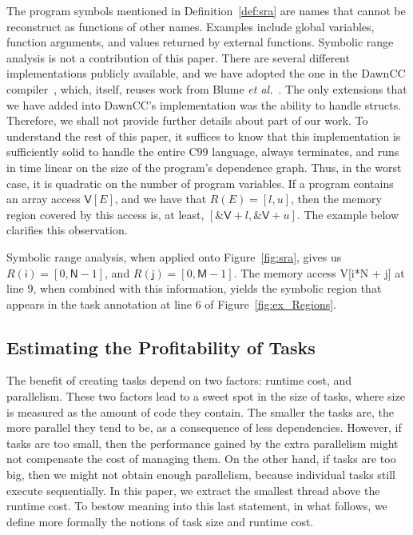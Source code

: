 \documentclass[sigplan,10pt,review,anonymous]{acmart}
\newcommand\dawn{\mbox{\textsf{DawnCC}}}
\begin{document}
The program symbols mentioned in Definition~\ref{def:sra} are names that cannot be
reconstruct as functions of other names.
Examples include global variables, function arguments, and values returned by
external functions.
Symbolic range analysis is not a contribution of this paper.
There are several different implementations publicly available, and we have
adopted the one in the \dawn{} compiler~\cite{Mendonca17}, which, itself,
reuses work from Blume {\em et al.}~\cite{Blume94}.
The only extensions that we have added into \dawn's implementation was
the ability to handle \textsf{structs}.
Therefore, we shall not provide further details about part of our work.
To understand the rest of this paper, it suffices to know that this implementation
is sufficiently solid to handle the entire C99 language, always terminates, and
runs in time linear on the size of the program's dependence graph.
Thus, in the worst case, it is quadratic on the number of program variables.
If a program contains an array access $\textsf{V}[E]$, and we have that
$R(E) = [l, u]$, then the memory region covered by this access is, at least,
$[\mathtt{\&}\textsf{V} + l, \mathtt{\&}\textsf{V} + u]$.
The example below clarifies this observation.

\begin{example}
\label{ex:sra}
Symbolic range analysis, when applied onto Figure~\ref{fig:sra}, gives us
$R(\mathsf{i}) = [0, \mathsf{N} - 1]$, and $R(\mathsf{j}) = [0, \mathsf{M} - 1]$.
The memory access \textsf{V[i*N + j]} at line 9, when combined with this
information, yields the symbolic region that appears in the task annotation at
line 6 of Figure~\ref{fig:ex_Regions}.
\end{example}

\subsection{Estimating the Profitability of Tasks}
\label{sub:profit}

The benefit of creating tasks depend on two factors:
runtime cost, and parallelism.
These two factors lead to a sweet spot in the size of tasks, where size is
measured as the amount of code they contain.
The smaller the tasks are, the more parallel they tend to be, as a consequence
of less dependencies.
However, if tasks are too small, then the performance gained by the extra
parallelism might not compensate the cost of managing them.
On the other hand, if tasks are too big, then we might not obtain enough
parallelism, because individual tasks still execute sequentially.
In this paper, we extract the smallest thread above the runtime cost.
To bestow meaning into this last statement, in what follows, we define more
formally the notions of task size and runtime cost.
\end{document}
